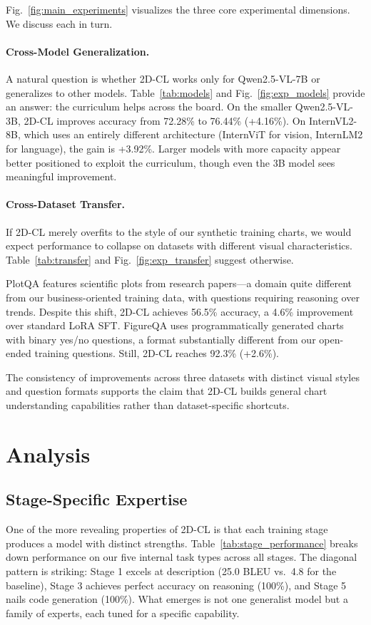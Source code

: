 ﻿\documentclass[journal]{IEEEtran}
\newcommand{\method}{2D-CL}
\begin{document}
Fig.~\ref{fig:main_experiments} visualizes the three core experimental dimensions. We discuss each in turn.

\paragraph{Cross-Model Generalization.}
A natural question is whether \method{} works only for Qwen2.5-VL-7B or generalizes to other models. Table~\ref{tab:models} and Fig.~\ref{fig:exp_models} provide an answer: the curriculum helps across the board. On the smaller Qwen2.5-VL-3B, \method{} improves accuracy from 72.28\% to 76.44\% (+4.16\%). On InternVL2-8B, which uses an entirely different architecture (InternViT for vision, InternLM2 for language), the gain is +3.92\%. Larger models with more capacity appear better positioned to exploit the curriculum, though even the 3B model sees meaningful improvement.

\paragraph{Cross-Dataset Transfer.}
If \method{} merely overfits to the style of our synthetic training charts, we would expect performance to collapse on datasets with different visual characteristics. Table~\ref{tab:transfer} and Fig.~\ref{fig:exp_transfer} suggest otherwise.

PlotQA features scientific plots from research papers---a domain quite different from our business-oriented training data, with questions requiring reasoning over trends. Despite this shift, \method{} achieves 56.5\% accuracy, a 4.6\% improvement over standard LoRA SFT. FigureQA uses programmatically generated charts with binary yes/no questions, a format substantially different from our open-ended training questions. Still, \method{} reaches 92.3\% (+2.6\%).

The consistency of improvements across three datasets with distinct visual styles and question formats supports the claim that \method{} builds general chart understanding capabilities rather than dataset-specific shortcuts.

\section{Analysis}
\subsection{Stage-Specific Expertise}
One of the more revealing properties of \method{} is that each training stage produces a model with distinct strengths. Table~\ref{tab:stage_performance} breaks down performance on our five internal task types across all stages. The diagonal pattern is striking: Stage 1 excels at description (25.0 BLEU vs.\ 4.8 for the baseline), Stage 3 achieves perfect accuracy on reasoning (100\%), and Stage 5 nails code generation (100\%). What emerges is not one generalist model but a family of experts, each tuned for a specific capability.
\end{document}
